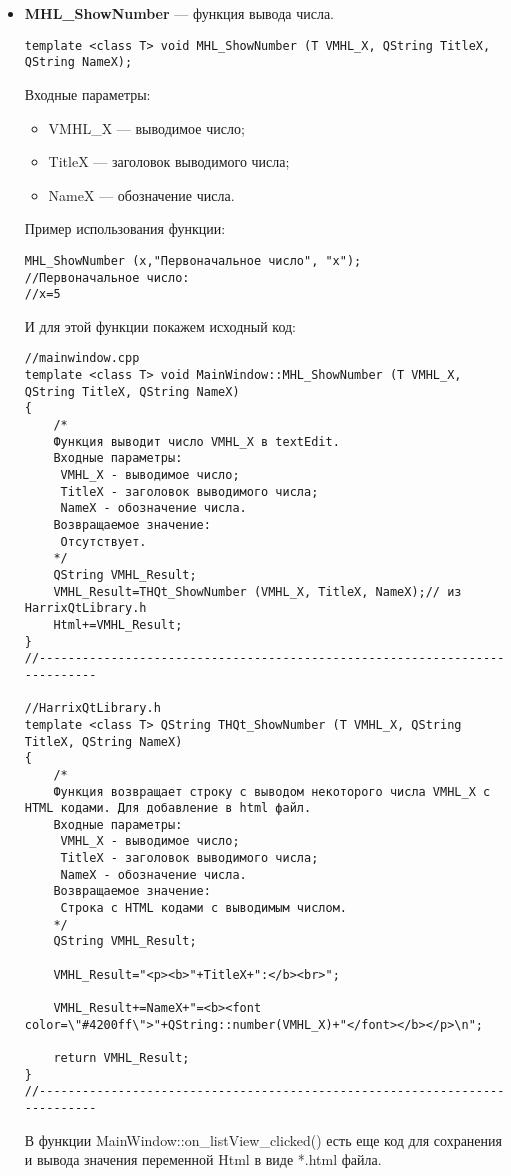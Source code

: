 \documentclass[a4paper,12pt]{article}
\begin{document}
\begin{itemize}
\item \textbf{MHL\_ShowNumber} --- функция вывода числа. 
\begin{lstlisting}[label=examplefunction13, caption=Синтаксис функции MHL\_ShowNumber]
template <class T> void MHL_ShowNumber (T VMHL_X, QString TitleX, QString NameX);
\end{lstlisting}
Входные параметры: 
\begin{itemize}   
    \item  VMHL\_X --- выводимое число;
     \item TitleX --- заголовок выводимого числа;
     \item NameX --- обозначение числа.
\end{itemize}
Пример использования функции:
\begin{lstlisting}[label=examplefunction10, caption=Пример использования MHL\_ShowNumber]
MHL_ShowNumber (x,"Первоначальное число", "x");
//Первоначальное число:
//x=5
\end{lstlisting}
И для этой функции покажем исходный код:
\begin{lstlisting}[label=examplefunction11, caption=Реализация функции MHL\_ShowNumber]
//mainwindow.cpp
template <class T> void MainWindow::MHL_ShowNumber (T VMHL_X, QString TitleX, QString NameX)
{
    /*
    Функция выводит число VMHL_X в textEdit.
    Входные параметры:
     VMHL_X - выводимое число;
     TitleX - заголовок выводимого числа;
     NameX - обозначение числа.
    Возвращаемое значение:
     Отсутствует.
    */
    QString VMHL_Result;
    VMHL_Result=THQt_ShowNumber (VMHL_X, TitleX, NameX);// из HarrixQtLibrary.h
    Html+=VMHL_Result;
}
//---------------------------------------------------------------------------

//HarrixQtLibrary.h
template <class T> QString THQt_ShowNumber (T VMHL_X, QString TitleX, QString NameX)
{
    /*
    Функция возвращает строку с выводом некоторого числа VMHL_X с HTML кодами. Для добавление в html файл.
    Входные параметры:
     VMHL_X - выводимое число;
     TitleX - заголовок выводимого числа;
     NameX - обозначение числа.
    Возвращаемое значение:
     Строка с HTML кодами с выводимым числом.
    */
    QString VMHL_Result;

    VMHL_Result="<p><b>"+TitleX+":</b><br>";

    VMHL_Result+=NameX+"=<b><font color=\"#4200ff\">"+QString::number(VMHL_X)+"</font></b></p>\n";

    return VMHL_Result;
}
//---------------------------------------------------------------------------
\end{lstlisting}
В функции MainWindow::on\_listView\_clicked() есть еще код для сохранения и вывода значения переменной Html в виде *.html файла.


\end{itemize}
\end{document}
